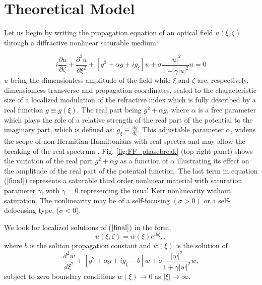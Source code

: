 \documentclass[aps,pre,showpacs,twocolumn]{revtex4}
\begin{document}
 
\section{Theoretical Model}
Let us begin by writing the propagation equation of an optical field $u(\xi,\zeta)$ through a diffractive nonlinear saturable medium:

\begin{equation}
    i\frac{\partial u}{\partial\zeta}+\frac{\partial^{2}u}%
{\partial\xi^{2}}+\left[ g^2+\alpha g+i g_\xi \right]
u
+\sigma \frac{|u|^2}{1+\gamma|u|^2}u=0
\label{final}
\end{equation}
$u$ being the dimensionless amplitude of the field  while $\xi$ and $\zeta$ are, respectively, dimensionless transverse and propagation coordinates, scaled to the characteristic size of a localized 
modulation of the refractive index which is fully described by a real function $g\equiv g(\xi)$. 
The real part being $g^2+\alpha g$, where $\alpha$ is a free parameter which plays the role of a relative strength of the 
real part of the potential to the imaginary part, which is defined as:  $g_{\xi}\equiv\frac{dg}{d\xi}$. This adjustable parameter $\alpha$, widens the scope of non-Hermitian Hamiltonians with real spectra and may allow the breaking of the real spectrum \cite{Yang2016}. Fig.  \ref{fig:FF_phasebreak} (top right panel) shows the variation of the real part $g^2 + \alpha g$ as a function of $\alpha$ illustrating its effect on the amplitude of the real part of the potential function. The last term 
in equation ($\ref{final}$) represents a saturable third order nonlinear  material with saturation parameter $\gamma$, with $\gamma=0$ representing the usual Kerr nonlinearity without saturation. The nonlinearity may be of a self-focusing $(\sigma > 0)$ or a self-defocusing type, ($\sigma < 0$).

We look 
for localized solutions of ($\ref{final}$) in the form,
\begin{equation}
u\left(  \xi,\zeta\right)  =w\left(  \xi\right)  e^{ib\zeta}, ,\label{statio}%
\end{equation}
where $b$ is the soliton propagation constant and  $w(\xi)$  is the solution of
\begin{equation}
\frac{d^{2}w}{d\xi^{2}}+\left[ g^2+\alpha g+i g_\xi -b\right]  w+\sigma \frac{|w|^2}{1+\gamma |w|^2}w,
\label{stat}
\end{equation}
subject to zero boundary conditions $ w\left(  \xi\right)\to 0 $ as $|\xi|\to \infty$.
\end{document}
